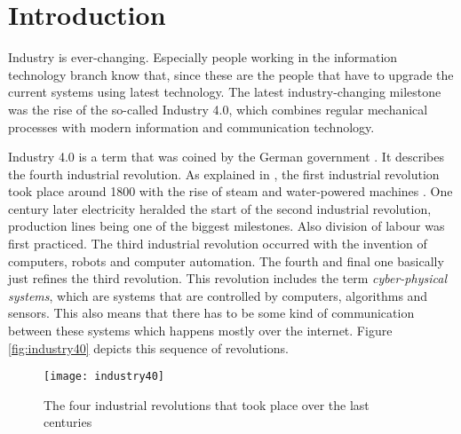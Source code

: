 \chapter{Introduction}
\label{ch:Introduction}




Industry is ever-changing. Especially people working in the information technology branch know that, since these are the people that have to upgrade the current systems using latest technology. The latest industry-changing milestone was the rise of the so-called Industry 4.0, which combines regular mechanical processes with modern information and communication technology.

Industry 4.0 is a term that was coined by the German government \autocite{Industrie4.0Paper}. It describes the fourth industrial revolution. As explained in , the first industrial revolution took place around 1800 with the rise of steam and water-powered machines \autocite{Industrie4.0History}. One century later electricity heralded the start of the second industrial revolution, production lines being one of the biggest milestones. Also division of labour was first practiced. The third industrial revolution occurred with the invention of computers, robots and computer automation. The fourth and final one basically just refines the third revolution. This revolution includes the term \textit{cyber-physical systems}, which are systems that are controlled by computers, algorithms and sensors. This also means that there has to be some kind of communication between these systems which happens mostly over the internet. Figure \vref{fig:industry40} depicts this sequence of revolutions.

\begin{figure}[H]
    \centering
    \texttt{[image: industry40]}
    \caption[The four industrial revolutions that took place over the last centuries]{The four industrial revolutions that took place over the last centuries\footnotemark}
    \label{fig:industry40}
\end{figure}

